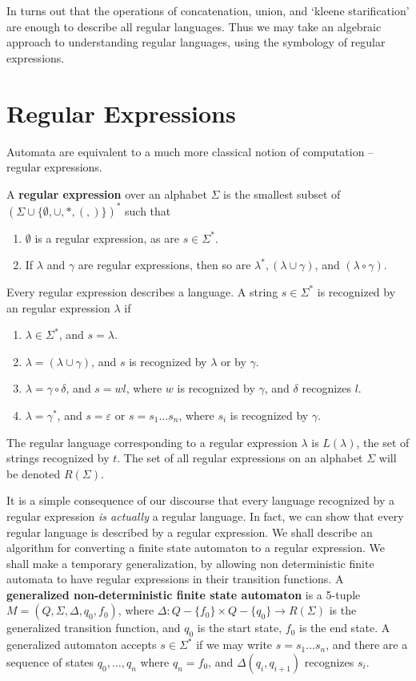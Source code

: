 In turns out that the operations of concatenation, union, and `kleene starification' are enough to describe all regular languages. Thus we may take an algebraic approach to understanding regular languages, using the symbology of regular expressions.

\section{Regular Expressions}

Automata are equivalent to a much more classical notion of computation -- regular expressions.

\begin{definition}
    A {\bf regular expression} over an alphabet $\Sigma$ is the smallest subset of $(\Sigma \cup \{ \emptyset, \cup, *, (, ) \})^*$ such that
    \begin{enumerate}
        \item $\emptyset$ is a regular expression, as are $s \in \Sigma^*$.
        \item If $\lambda$ and $\gamma$ are regular expressions, then so are $\lambda^*, (\lambda \cup \gamma)$, and $(\lambda \circ \gamma)$.
    \end{enumerate}
\end{definition}
%
Every regular expression describes a language. A string $s \in \Sigma^*$ is recognized by an regular expression $\lambda$ if
%
\begin{enumerate}
    \item $\lambda \in \Sigma^*$, and $s = \lambda$.
    \item $\lambda = (\lambda \cup \gamma)$, and $s$ is recognized by $\lambda$ or by $\gamma$.
    \item $\lambda = \gamma \circ \delta$, and $s = wl$, where $w$ is recognized by $\gamma$, and $\delta$ recognizes $l$.
    \item $\lambda = \gamma^*$, and $s = \varepsilon$ or $s = s_1 \dots s_n$, where $s_i$ is recognized by $\gamma$.
\end{enumerate}
%
The regular language corresponding to a regular expression $\lambda$ is $L(\lambda)$, the set of strings recognized by $t$. The set of all regular expressions on an alphabet $\Sigma$ will be denoted $R(\Sigma)$.

It is a simple consequence of our discourse that every language recognized by a regular expression {\it is actually} a regular language. In fact, we can show that every regular language is described by a regular expression. We shall describe an algorithm for converting a finite state automaton to a regular expression. We shall make a temporary generalization, by allowing non deterministic finite automata to have regular expressions in their transition functions. A {\bf generalized non-deterministic finite state automaton} is a 5-tuple $M = (Q,\Sigma, \Delta, q_0, f_0)$, where $\Delta: Q - \{ f_0 \} \times Q - \{ q_0 \} \to R(\Sigma)$ is the generalized transition function, and $q_0$ is the start state, $f_0$ is the end state. A generalized automaton accepts  $s \in \Sigma^*$ if we may write $s = s_1 \dots s_n$, and there are a sequence of states $q_0, \dots, q_n$ where $q_n = f_0$, and $\Delta(q_i, q_{i+1})$ recognizes $s_i$.

